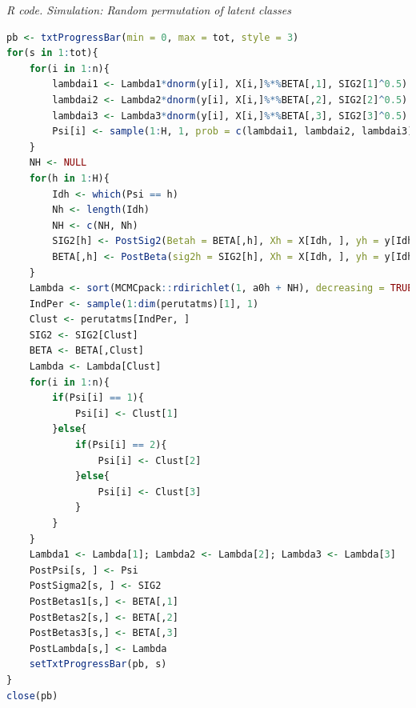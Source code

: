 \begin{enumerate}[leftmargin=*]
\begin{tcolorbox}[enhanced,width=4.67in,center upper,
	fontupper=\large\bfseries,drop shadow southwest,sharp corners]
	\textit{R code. Simulation: Random permutation of latent classes}
	\begin{VF}
		\begin{lstlisting}[language=R]
pb <- txtProgressBar(min = 0, max = tot, style = 3)
for(s in 1:tot){
	for(i in 1:n){
		lambdai1 <- Lambda1*dnorm(y[i], X[i,]%*%BETA[,1], SIG2[1]^0.5)
		lambdai2 <- Lambda2*dnorm(y[i], X[i,]%*%BETA[,2], SIG2[2]^0.5)
		lambdai3 <- Lambda3*dnorm(y[i], X[i,]%*%BETA[,3], SIG2[3]^0.5)
		Psi[i] <- sample(1:H, 1, prob = c(lambdai1, lambdai2, lambdai3))
	}
	NH <- NULL
	for(h in 1:H){
		Idh <- which(Psi == h)
		Nh <- length(Idh)
		NH <- c(NH, Nh)
		SIG2[h] <- PostSig2(Betah = BETA[,h], Xh = X[Idh, ], yh = y[Idh])
		BETA[,h] <- PostBeta(sig2h = SIG2[h], Xh = X[Idh, ], yh = y[Idh])
	}
	Lambda <- sort(MCMCpack::rdirichlet(1, a0h + NH), decreasing = TRUE)
	IndPer <- sample(1:dim(perutatms)[1], 1)
	Clust <- perutatms[IndPer, ]
	SIG2 <- SIG2[Clust]
	BETA <- BETA[,Clust]
	Lambda <- Lambda[Clust]
	for(i in 1:n){
		if(Psi[i] == 1){
			Psi[i] <- Clust[1]
		}else{
			if(Psi[i] == 2){
				Psi[i] <- Clust[2]
			}else{
				Psi[i] <- Clust[3]
			}
		}
	}
	Lambda1 <- Lambda[1]; Lambda2 <- Lambda[2]; Lambda3 <- Lambda[3]
	PostPsi[s, ] <- Psi
	PostSigma2[s, ] <- SIG2
	PostBetas1[s,] <- BETA[,1]
	PostBetas2[s,] <- BETA[,2]
	PostBetas3[s,] <- BETA[,3]
	PostLambda[s,] <- Lambda 
	setTxtProgressBar(pb, s)
}
close(pb)
\end{lstlisting}
	\end{VF}
\end{tcolorbox}


\end{enumerate}
